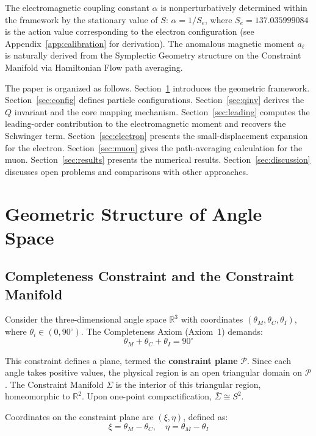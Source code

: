 \documentclass[aps,prd,reprint,nofootinbib]{revtex4-2}
\begin{document}
The electromagnetic coupling constant $\alpha$ is nonperturbatively determined within the framework by the stationary value of $S$: $\alpha = 1/S_e$, where $S_e = 137.035999084$ is the action value corresponding to the electron configuration (see Appendix~\ref{app:calibration} for derivation). The anomalous magnetic moment $a_\ell$ is naturally derived from the Symplectic Geometry structure on the Constraint Manifold via Hamiltonian Flow path averaging.

The paper is organized as follows. Section~\ref{sec:geo} introduces the geometric framework. Section~\ref{sec:config} defines particle configurations. Section~\ref{sec:qinv} derives the $Q$ invariant and the core mapping mechanism. Section~\ref{sec:leading} computes the leading-order contribution to the electromagnetic moment and recovers the Schwinger term. Section~\ref{sec:electron} presents the small-displacement expansion for the electron. Section~\ref{sec:muon} gives the path-averaging calculation for the muon. Section~\ref{sec:results} presents the numerical results. Section~\ref{sec:discussion} discusses open problems and comparisons with other approaches.

\section{Geometric Structure of Angle Space}
\label{sec:geo}

\subsection{Completeness Constraint and the Constraint Manifold}

Consider the three-dimensional angle space $\mathbb{R}^3$ with coordinates $(\theta_M, \theta_C, \theta_I)$, where $\theta_i \in (0, 90^\circ)$. The Completeness Axiom (Axiom~1) demands:
\begin{equation}
\theta_M + \theta_C + \theta_I = 90^\circ \label{eq:completeness}
\end{equation}

This constraint defines a plane, termed the \textbf{constraint plane} $\mathcal{P}$. Since each angle takes positive values, the physical region is an open triangular domain on $\mathcal{P}$. The Constraint Manifold $\Sigma$ is the interior of this triangular region, homeomorphic to $\mathbb{R}^2$. Upon one-point compactification, $\bar{\Sigma} \cong S^2$.

Coordinates on the constraint plane are $(\xi, \eta)$, defined as:
\begin{equation}
\xi = \theta_M - \theta_C, \quad \eta = \theta_M - \theta_I \label{eq:coords}
\end{equation}
\end{document}
